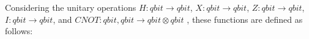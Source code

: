 
Considering the unitary operations $H: \textit{qbit} \xrightarrow{}  \textit{qbit}$, $X: \textit{qbit} \xrightarrow{}  \textit{qbit}$, $Z: \textit{qbit} \xrightarrow{}  \textit{qbit}$, $I: \textit{qbit} \xrightarrow{}  \textit{qbit}$, and $\textit{CNOT}: \textit{qbit}, \textit{qbit} \xrightarrow{}  \textit{qbit} \otimes \textit{qbit}$ , these functions are defined as follows:


